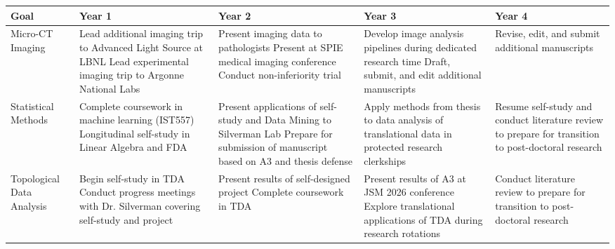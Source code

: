 \documentclass{NIHGrant}
\begin{document}
\begin{table}[h]
\centering
\scriptsize
\begin{tabularx}{\textwidth}{|l|>{\centering\arraybackslash}X|>{\centering\arraybackslash}X|>{\centering\arraybackslash}X|>{\centering\arraybackslash}X|}
  \hline
    \textbf{Goal} & \textbf{Year 1} & \textbf{Year 2} & \textbf{Year 3} & \textbf{Year 4} \\
    \hline
    Micro-CT Imaging &
    Lead additional imaging trip to Advanced Light Source at LBNL \newline
    Lead experimental imaging trip to Argonne National Labs &
                                                              Present imaging data to pathologists \newline
                                                              Present at SPIE medical imaging conference \newline
                                                              Conduct non-inferiority trial &
    Develop image analysis pipelines during dedicated research time \newline
    Draft, submit, and edit additional manuscripts &
    Revise, edit, and submit additional manuscripts \\
    \hline
    Statistical Methods &
    Complete coursework in machine learning (IST557) \newline
    Longitudinal self-study in Linear Algebra and FDA &
    Present applications of self-study and Data Mining to Silverman Lab \newline
    Prepare for submission of manuscript based on A3 and thesis defense &
    Apply methods from thesis to data analysis of translational data in protected research clerkships&                                                                                                                                                         Resume self-study and conduct literature review to prepare for transition to post-doctoral research \\
    \hline
    Topological Data Analysis &
    Begin self-study in TDA \newline
    Conduct progress meetings with Dr. Silverman covering self-study and project &
    Present results of self-designed project \newline
    Complete coursework in TDA &
    Present results of A3 at JSM 2026 conference \newline
    Explore translational applications of TDA during research rotations &
    Conduct literature review to prepare for transition to post-doctoral research \\

\end{tabularx}
\end{table}
\end{document}
